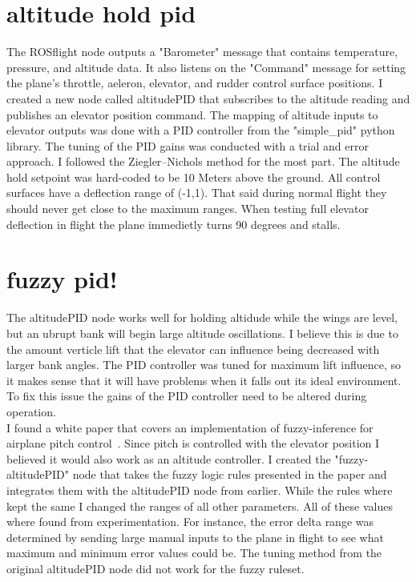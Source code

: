 \documentclass[11pt]{scrartcl} %
\begin{document}
\section{altitude hold pid}
The ROSflight node outputs a "Barometer" message that contains temperature, pressure, and altitude data. It also listens on the "Command" message for setting the plane's throttle, aeleron, elevator, and rudder control surface positions. I created a new node called altitudePID that subscribes to the altitude reading and publishes an elevator position command. The mapping of altitude inputs to elevator outputs was done with a PID controller from the "simple\_pid" python library. The tuning of the PID gains was conducted with a trial and error approach. I followed the Ziegler–Nichols method for the most part. The altitude hold setpoint was hard-coded to be 10 Meters above the ground. All control surfaces have a deflection range of (-1,1). That said during normal flight they should never get close to the maximum ranges. When testing full elevator deflection in flight the plane immedietly turns 90 degrees and stalls.



\section{fuzzy pid!}
The altitudePID node works well for holding altidude while the wings are level, but an ubrupt bank will begin large altitude oscillations. I believe this is due to the amount verticle lift that the elevator can influence being decreased with larger bank angles. The PID controller was tuned for maximum lift influence, so it makes sense that it will have problems when it falls out its ideal environment. To fix this issue the gains of the PID controller need to be altered during operation.  
\\

I found a white paper that covers an implementation of fuzzy-inference for airplane pitch control~\cite{fuzzy}. Since pitch is controlled with the elevator position I believed it would also work as an altitude controller. I created the "fuzzy-altitudePID" node that takes the fuzzy logic rules presented in the paper and integrates them with the altitudePID node from earlier. While the rules where kept the same I changed the ranges of all other parameters. All of these values where found from experimentation. For instance, the error delta range was determined by sending large manual inputs to the plane in flight to see what maximum and minimum error values could be. The tuning method from the original altitudePID node did not work for the fuzzy ruleset. 
\end{document}
